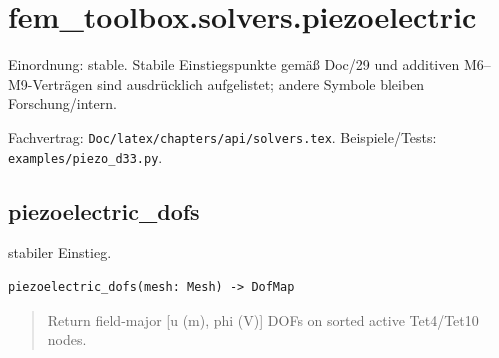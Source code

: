 \section{fem\_toolbox.solvers.piezoelectric}
Einordnung: stable. Stabile Einstiegspunkte gemäß Doc/29 und additiven M6–M9-Verträgen sind ausdrücklich aufgelistet; andere Symbole bleiben Forschung/intern.
\par Fachvertrag: \nolinkurl{Doc/latex/chapters/api/solvers.tex}. Beispiele/Tests:
\nolinkurl{examples/piezo_d33.py}.
\subsection{piezoelectric\_dofs}
stabiler Einstieg.
\begin{lstlisting}
piezoelectric_dofs(mesh: Mesh) -> DofMap
\end{lstlisting}
\begin{quote}
Return field-major [u (m), phi (V)] DOFs on sorted active Tet4/Tet10 nodes.
\end{quote}
